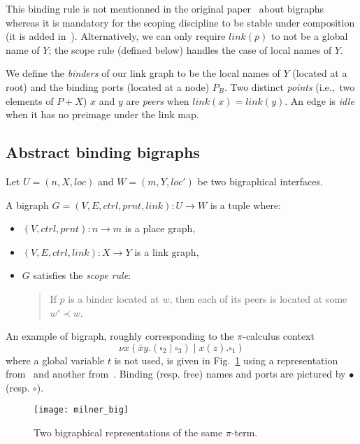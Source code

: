 \documentclass{llncs}
\newcommand{\ie}{i.e.,}
\newcommand{\loc}{\mathit{loc}}
\newcommand{\prnt}{\mathit{prnt}}
\newcommand{\link}{\mathit{link}}
\newcommand{\ctrl}{\mathit{ctrl}}
\begin{document}
This binding rule is not mentionned in the original
paper~\cite{Milner:bigraphs} about bigraphs whereas it is mandatory
for the scoping discipline to be stable under composition (it is added
in~\cite{Milner:bigraphs2}). 
Alternatively, we can only require $\link(p)$ to not be a global name of $Y$;
the scope rule (defined below) handles the case of local names of $Y$. 

We define the \emph{binders} of our link
graph to be the local names of $Y$ (located at a root) and the binding
ports (located at a node) $P_B$.
Two distinct \emph{points} (\ie\, two elements of $P + X$) $x$ and $y$ are
\emph{peers} when $\link(x) = \link(y)$. 
An edge is \emph{idle} when it has no preimage under the link map. 

\subsection{Abstract binding bigraphs}
\label{bigraph:sec:def}
Let $U = ( n,X,\loc )$ and $W = ( m,Y,\loc' )$ be two
bigraphical interfaces. 
\begin{definition}
    A bigraph $G = ( V,E,\ctrl,\prnt,\link ) : U \to W$ is a tuple where: 
    \begin{itemize}
	\item $(V,\ctrl,\prnt): n \to m$ is a place graph,
	\item $(V,E,\ctrl,\link): X \to Y$ is a link graph, 
	\item $G$ satisfies the \emph{scope rule}:
	    \begin{quote}
		If $p$ is a binder located at $w$, then each of its peers is located at
		some $w' \prec w$. 
	    \end{quote}
    \end{itemize}
\end{definition}

\begin{example}
  An example of bigraph, roughly corresponding to the $\pi$-calculus
  context $$\nu x (\bar{x}y.(\square_2 \mid \square_3) \mid
  x(z).\square_1)$$ where a global variable $t$ is not used, is given in Fig.~\ref{bigraph:milner} using a
  representation from~\cite{Milner:bigraphs} and another from~\cite{Hildebrandt:choco}.  Binding (resp. free) names and ports are
  pictured by $\bullet$ (resp. $\circ$).
\end{example}
\begin{figure}[ht!]\centering
    \texttt{[image: milner\_big]}
    \caption{Two bigraphical representations of the same $\pi$-term.}
    \label{bigraph:milner}
\end{figure}
\end{document}
